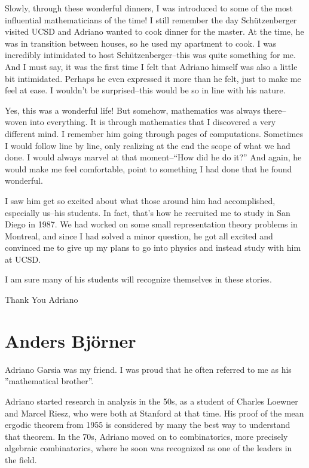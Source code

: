 \documentclass{notices}
\begin{document}
Slowly, through these wonderful dinners, I was introduced to some of the most influential mathematicians of the time! I still remember the day Schützenberger visited UCSD and Adriano wanted to cook dinner for the master. At the time, he was in transition between houses, so he used my apartment to cook. I was incredibly intimidated to host Schützenberger--this was quite something for me. And I must say, it was the first time I felt that Adriano himself was also a little bit intimidated. Perhaps he even expressed it more than he felt, just to make me feel at ease. I wouldn’t be surprised--this would be so in line with his nature.

Yes, this was a wonderful life! But somehow, mathematics was always there--woven into everything. It is through mathematics that I discovered a very different mind. I remember him going through pages of computations. Sometimes I would follow line by line, only realizing at the end the scope of what we had done. I would always marvel at that moment--``How did he do it?'' And again, he would make me feel comfortable, point to something I had done that he found wonderful.

I saw him get so excited about what those around him had accomplished, especially us--his students. In fact, that’s how he recruited me to study in San Diego in 1987. We had worked on some small representation theory problems in Montreal, and since I had solved a minor question, he got all excited and convinced me to give up my plans to go into physics and instead study with him at UCSD.

I am sure many of his students will recognize themselves in these stories.

Thank You Adriano

\section*{Anders Bj\"orner}

Adriano Garsia was my friend. I was proud that he often referred to me as his ”mathematical brother”. 
 
Adriano started research in analysis in the 50s, as a student of Charles Loewner and Marcel Riesz, who were both at Stanford at that time. His proof of the mean ergodic theorem from 1955 is considered by many the best way to understand that theorem. In the 70s, Adriano moved on to combinatorics, more precisely algebraic combinatorics, where he soon was recognized as one of the leaders in the field.
 
\end{document}
